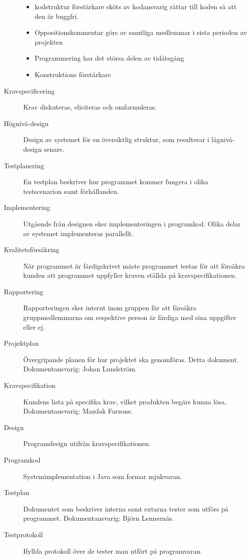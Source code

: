 \documentclass[a4paper]{article}
\begin{document}
\begin{description}
\begin{itemize}
 \item kodstruktur förstärkare sköts av kodansvarig rättar till koden så att den är buggfri. 
 
 \item Oppositionskommentar görs av samtliga medlemmar i sista perioden av projekten 
 
 \item Programmering har det störsa delen av tidåtsgång
 \item Konstruktions förstärkare

\end{itemize}

 \item[Kravspecificering] Krav diskuteras, eliciteras och omformuleras.

 \item[Högnivå-design] Design av systemet för en översiktlig struktur, som resulterar i lågnivå-design senare.

 \item[Testplanering] En testplan beskriver hur programmet kommer fungera i olika testscenarion samt förhållanden.
 
 \item[Implementering] Utgående från designen sker implementeringen i programkod. Olika delar av systemet implementeras parallellt.

 \item[Kvalitetsförsäkring] När programmet är färdigskrivet måste programmet testas för att försäkra kunden att programmet uppfyller kraven ställda på kravspecifikationen.
 
 \item[Rapportering] Rapporteringen sker internt inom gruppen fär att färsäkra gruppmedlemmarna om respektive person är färdiga med sina uppgifter eller ej.

 \item[Projektplan] Övergripande planen för hur projektet ska genomföras. Detta dokument. Dokumentansvarig: Johan Lundström.

 \item[Kravspecifikation] Kundens lista på specifika krav, vilket produkten begärs kunna lösa. Dokumentansvarig: Mazdak Farzone.

 \item[Design] Programdesign utifrån kravspecifikationen.
 
 \item[Programkod] Systemimplementation i Java som formar mjukvaran.

 \item[Testplan] Dokumentet som beskriver interna samt extarna tester som utförs på programmet. Dokumentansvarig: Björn Lennernäs.

 \item[Testprotokoll] Ifyllda protokoll över de tester man utfört på programvaran.
\end{description}
\
\
\end{document}
